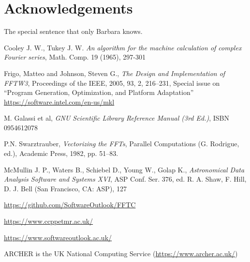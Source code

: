 \documentclass[12pt, a4paper]{article}
\begin{document}
\section{Acknowledgements}
The special sentence that only Barbara knows.
\begin{thebibliography}{9}

Cooley J. W., Tukey J. W.
{\it An algorithm for the machine calculation of complex Fourier series},
Math. Comp. 19 (1965), 297-301
 
Frigo, Matteo and Johnson, Steven G.,
{\it The Design and Implementation of FFTW3},
Proceedings of the IEEE,
2005,
93,
2,
216--231,
Special issue on ``Program Generation, Optimization, and Platform Adaptation''
\hyperlink{https://software.intel.com/en-us/mkl}{https://software.intel.com/en-us/mkl}

M. Galassi et al, {\it GNU Scientific Library Reference Manual (3rd Ed.)}, ISBN 0954612078
  
P.N. Swarztrauber, {\it Vectorizing the FFTs}, Parallel Computations (G. Rodrigue, ed.), Academic Press, 1982, pp. 51--83.
  
McMullin J. P., Waters B., Schiebel D., Young W., Golap K.,
{\it Astronomical Data Analysis Software and Systems XVI},
ASP Conf. Ser. 376, ed. R. A. Shaw, F. Hill, D. J. Bell (San Francisco, CA: ASP), 127

\hyperlink{https://github.com/SoftwareOutlook/FFTC}{https://github.com/SoftwareOutlook/FFTC}
    
\hyperlink{https://www.ccppetmr.ac.uk/}{https://www.ccppetmr.ac.uk/}

\hyperlink{https://www.softwareoutlook.ac.uk/}{https://www.softwareoutlook.ac.uk/}

ARCHER is the UK National Computing Service (\hyperlink{https://www.archer.ac.uk/}{https://www.archer.ac.uk/})
  
\end{thebibliography}
\end{document}
